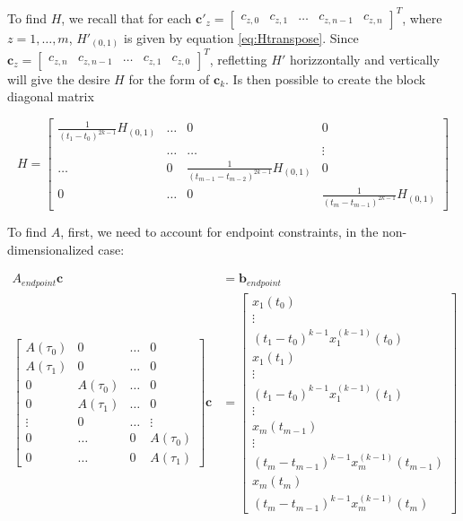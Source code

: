 \noindent To find $H$, we recall that for each $\mathbf{c}'_z=\begin{bmatrix}c_{z,0} & c_{z,1} & \dots & c_{z,n-1} & c_{z,n} \end{bmatrix}^T$, where $z=1,\dots,m$, $H'_{(0,1)}$ is given by equation \eqref{eq:Htranspose}. Since $\mathbf{c}_z=\begin{bmatrix}c_{z,n} & c_{z,n-1} & \dots & c_{z,1} & c_{z,0}\end{bmatrix}^T$, refletting $H'$ horizzontally and vertically will give the desire $H$ for the form of $\mathbf{c}_k$. Is then possible to create the block diagonal matrix 

\begin{equation}
	H = 
	\begin{bmatrix}
		\frac{1}{(t_1-t_0)^{2k-1}}H_{(0,1)} & \dots & 0 & 0 \\
		 & \dots & \dots & \vdots \\
		\dots & 0 & \frac{1}{(t_{m-1}-t_{m-2})^{2k-1}}H_{(0,1)} & 0 \\
		0 & \dots & 0 & \frac{1}{(t_m-t_{m-1})^{2k-1}}H_{(0,1)}
	\end{bmatrix}	
\end{equation}

\noindent To find $A$, first, we need to account for endpoint constraints, in the non-dimensionalized case:

\begin{align}
	A_{endpoint}\mathbf{c} &= \mathbf{b}_{endpoint} \\
	\begin{bmatrix}
		A(\tau_0) & 0         & \dots & 0         \\
		A(\tau_1) & 0         & \dots & 0         \\
		0         & A(\tau_0) & \dots & 0         \\
		0         & A(\tau_1) & \dots & 0         \\
		\vdots    & 0         & \dots & \vdots    \\
		0         & \dots     & 0     & A(\tau_0) \\
		0         & \dots     & 0     & A(\tau_1)            
	\end{bmatrix}
	\mathbf{c} &= 
	\begin{bmatrix}
		x_1(t_0) 								\\
		\vdots   								\\
		(t_1-t_0)^{k-1}x_1^{(k-1)}(t_0) 		\\
		x_1(t_1) 								\\
		\vdots   								\\
		(t_1-t_0)^{k-1}x_1^{(k-1)}(t_1) 		\\
		\vdots   								\\
		x_m(t_{m-1}) 							\\
		\vdots                                  \\
		(t_m-t_{m-1})^{k-1}x_m^{(k-1)}(t_{m-1}) \\
		x_m(t_m)                                \\
		(t_m-t_{m-1})^{k-1}x_m^{(k-1)}(t_m)
	\end{bmatrix} \nonumber
\end{align}

